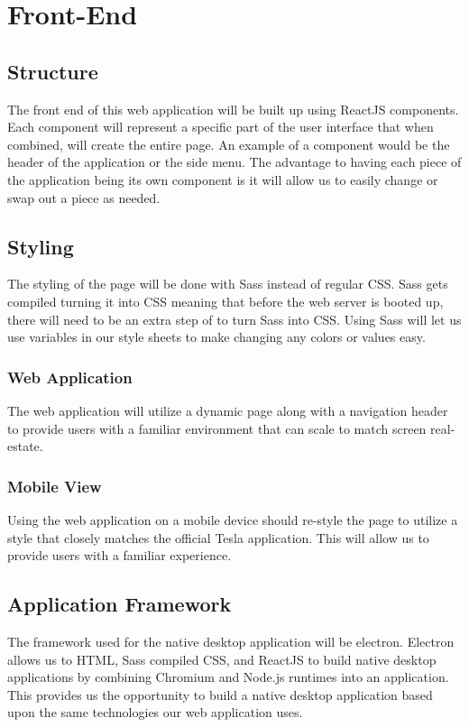 \documentclass[onecolumn, draftclsnofoot,10pt, compsoc]{IEEEtran}
\begin{document}
\section{Front-End}
    \subsection{Structure}
        The front end of this web application will be built up using ReactJS components.
        Each component will represent a specific part of the user interface that when combined, will create the entire page.
        An example of a component would be the header of the application or the side menu.
        The advantage to having each piece of the application being its own component is it will allow us to easily change or swap out a piece as needed.
    \subsection{Styling}
        The styling of the page will be done with Sass instead of regular CSS.
        Sass gets compiled turning it into CSS meaning that before the web server is booted up, there will need to be an extra step of to turn Sass into CSS.
        Using Sass will let us use variables in our style sheets to make changing any colors or values easy.
        \subsubsection{Web Application}
            The web application will utilize a dynamic page along with a navigation header to provide users with a familiar environment that can scale to match screen real-estate. 
        \subsubsection{Mobile View}
            Using the web application on a mobile device should re-style the page to utilize a style that closely matches the official Tesla application. This will allow us to provide users with a familiar experience.
    \subsection{Application Framework}
        The framework used for the native desktop application will be electron. Electron allows us to HTML, Sass compiled CSS, and ReactJS to build native desktop applications by combining Chromium and Node.js runtimes into an application. This provides us the opportunity to build a native desktop application based upon the same technologies our web application uses.
\end{document}
